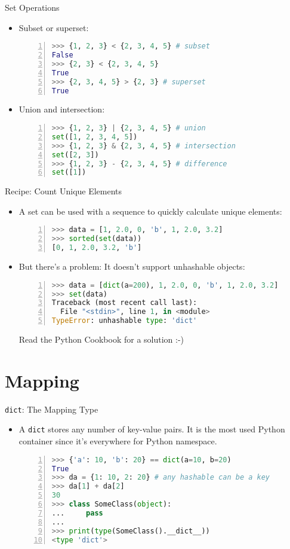 \documentclass[dvips,xcolor=pst,14pt]{beamer}
\begin{document}
\begin{frame}[fragile]{
%
Set Operations
%
}
\begin{itemize}
\item Subset or superset:
  \begin{lstlisting}[basicstyle=\scriptsize\ttfamily,numbers=left,language=Python]
>>> {1, 2, 3} < {2, 3, 4, 5} # subset
False
>>> {2, 3} < {2, 3, 4, 5}
True
>>> {2, 3, 4, 5} > {2, 3} # superset
True
  \end{lstlisting}
\item Union and intersection:
  \begin{lstlisting}[basicstyle=\scriptsize\ttfamily,numbers=left,language=Python]
>>> {1, 2, 3} | {2, 3, 4, 5} # union
set([1, 2, 3, 4, 5])
>>> {1, 2, 3} & {2, 3, 4, 5} # intersection
set([2, 3])
>>> {1, 2, 3} - {2, 3, 4, 5} # difference
set([1])
  \end{lstlisting}
\end{itemize}
\end{frame}

\begin{frame}[fragile]{
%
Recipe: Count Unique Elements
%
}
\begin{itemize}
\item A set can be used with a sequence to quickly calculate unique elements:
  \begin{lstlisting}[basicstyle=\scriptsize\ttfamily,numbers=left,language=Python]
>>> data = [1, 2.0, 0, 'b', 1, 2.0, 3.2]
>>> sorted(set(data))
[0, 1, 2.0, 3.2, 'b']
  \end{lstlisting}
\item But there's a problem: It doesn't support unhashable objects:
  \begin{lstlisting}[basicstyle=\scriptsize\ttfamily,numbers=left,language=Python]
>>> data = [dict(a=200), 1, 2.0, 0, 'b', 1, 2.0, 3.2]
>>> set(data)
Traceback (most recent call last):
  File "<stdin>", line 1, in <module>
TypeError: unhashable type: 'dict'
  \end{lstlisting}
  Read the Python Cookbook for a solution :-)
\end{itemize}
\end{frame}

\section{
Mapping
}

\begin{frame}[fragile]{
%
\texttt{dict}: The Mapping Type
%
}
\begin{itemize}
\item A \texttt{dict} stores any number of key-value pairs.  It is the most used
Python container since it's everywhere for Python namespace.
  \begin{lstlisting}[basicstyle=\scriptsize\ttfamily,numbers=left,language=Python]
>>> {'a': 10, 'b': 20} == dict(a=10, b=20)
True
>>> da = {1: 10, 2: 20} # any hashable can be a key
>>> da[1] + da[2]
30
>>> class SomeClass(object):
...     pass
... 
>>> print(type(SomeClass().__dict__))
<type 'dict'>
  \end{lstlisting}
\end{itemize}
\end{frame}
\end{document}
